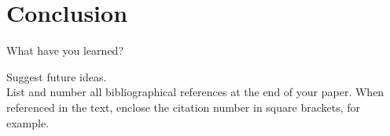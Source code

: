 \documentclass[10pt,twocolumn,letterpaper]{article}
\begin{document}
\section{Conclusion}
What have you learned? 

Suggest future ideas.\\

List and number all bibliographical references at the end of your paper. When referenced in the text,
enclose the citation number in square brackets, for
example. \\


\cite{slavkovikj2014image}
\cite{patterson2014sun}
\cite{rundle2011using}
\cite{zhou2017places}
\cite{DBLP:journals/corr/ZhouKLOT14}
\cite{DBLP:journals/corr/Wang15l}
\cite{DBLP:journals/corr/HeZRS15}
\cite{DBLP:journals/corr/ZagoruykoK16}
\cite{DBLP:journals/corr/ZhouKLTO16}
\cite{koehrsen2018blog}

{\small


}
\end{document}
